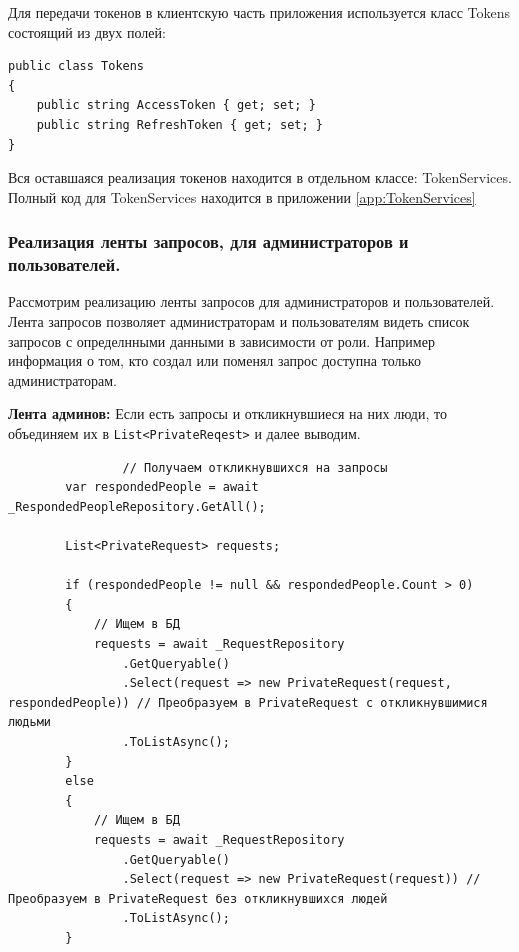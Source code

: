 Для передачи токенов в клиентскую часть приложения используется класс Tokens состоящий из двух полей:

\begin{verbatim}
public class Tokens
{
    public string AccessToken { get; set; }
    public string RefreshToken { get; set; }
}
\end{verbatim}

Вся оставшаяся реализация токенов находится в отдельном классе: TokenServices. Полный код для TokenServices находится в приложении \ref{app:TokenServices}

\subsubsection{Реализация ленты запросов, для администраторов и пользователей.}

Рассмотрим реализацию ленты запросов для администраторов и пользователей. Лента запросов позволяет администраторам и пользователям видеть список запросов с определнными данными в зависимости от роли. Например информация о том, кто создал или поменял запрос доступна только администраторам.

\textbf{Лента админов:} Если есть запросы и откликнувшиеся на них люди, то объединяем их в \texttt{List<PrivateReqest>} и далее выводим.
\begin{verbatim}
				// Получаем откликнувшихся на запросы
        var respondedPeople = await _RespondedPeopleRepository.GetAll();

        List<PrivateRequest> requests;

        if (respondedPeople != null && respondedPeople.Count > 0)
        {
            // Ищем в БД
            requests = await _RequestRepository
                .GetQueryable()
                .Select(request => new PrivateRequest(request, respondedPeople)) // Преобразуем в PrivateRequest с откликнувшимися людьми
                .ToListAsync();
        }
        else
        {
            // Ищем в БД
            requests = await _RequestRepository
                .GetQueryable()
                .Select(request => new PrivateRequest(request)) // Преобразуем в PrivateRequest без откликнувшихся людей
                .ToListAsync();
        }
\end{verbatim}

